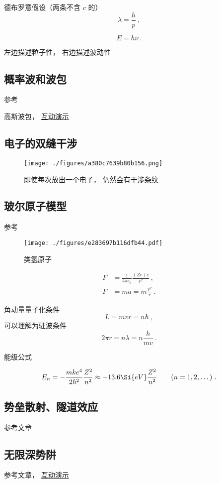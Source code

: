德布罗意假设（两条不含 $c$ 的）
\begin{equation}
\lambda = \frac{h}{p}~,
\end{equation}

\begin{equation}
E = h\nu~.
\end{equation}

左边描述粒子性， 右边描述波动性

\subsection{概率波和波包}
参考

高斯波包， \href{https://wuli.wiki/apps/gausWP.html}{互动演示}

\subsection{电子的双缝干涉}

\begin{figure}[ht]
\centering
\texttt{[image: ./figures/a380c7639b80b156.png]}
\caption{即使每次放出一个电子， 仍然会有干涉条纹} \label{fig_QMIntr_3}
\end{figure}

\subsection{玻尔原子模型}

参考

\begin{figure}[ht]
\centering
\texttt{[image: ./figures/e283697b116dfb44.pdf]}
\caption{类氢原子} \label{fig_QMIntr_1}
\end{figure}

\begin{equation}
\begin{aligned}
F &= \frac{1}{4\pi \epsilon_0} \frac{(Ze)e}{r^2}~,
\\
F &= ma = m\frac{v^2}{r}~.
\end{aligned}
\end{equation}

角动量量子化条件
\begin{equation}
L = mvr = n\hbar~,
\end{equation}
可以理解为驻波条件
\begin{equation}
2\pi r = n \lambda = n \frac{h}{mv}~.
\end{equation}

能级公式

\begin{equation}
E_n =  - \frac{m k e^4}{2 \hbar ^2} \frac{Z^2}{n^2} \approx - 13.6\Si{eV} \frac{Z^2}{n^2}
\qquad (n = 1, 2, \dots)~.
\end{equation}

\subsection{势垒散射、隧道效应}
参考文章

\subsection{无限深势阱}
参考文章， \href{https://wuli.wiki/apps/QMISW.html}{互动演示}
